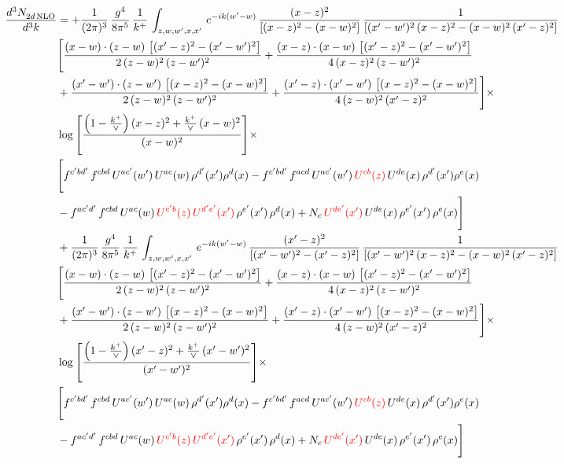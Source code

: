 \documentclass[9pt]{article}
\numberwithin{equation}{section}
\begin{document}
\begin{align}
 \frac{d^{3}N_{2d\,\rm NLO}^{\rm}}{d^{3}k}  & =   +\frac{1}{(2\pi)^{3}}\, \frac{g^{4}}{8\pi^{5}}\,\frac{1}{k^{+}}\,\int_{z,w,w^{\prime},x,x'}\, e^{-ik(w^{\prime}-w)}\,\frac{(x-z)^{2}}{\left[(x-z)^{2}-(x-w)^{2}\right]}\,\frac{1}{\left[(x'-w')^{2}\,(x-z)^{2} - (x-w)^{2}\,(x'-z)^{2}\right]}\notag \\ & \Bigg[\frac{(x-w)\cdot (z-w)\, \left[(x'-z)^{2}-(x'-w')^{2}\right]}{2\, (z-w)^{2}\, (z-w')^{2}}  + \frac{(x-z)\cdot (x-w)\,\left[(x'-z)^{2}-(x'-w')^{2}\right] }{4\,(x-z)^{2}\,(z-w')^{2}}\notag \\ & +\frac{(x'-w')\cdot (z-w')\, \left[(x-z)^{2}-(x-w)^{2}\right]}{2\, (z-w)^{2}\, (z-w')^{2}}+ \frac{(x'-z)\cdot (x'-w')\, \left[(x-z)^{2}-(x-w)^{2}\right]}{4\, (z-w)^{2}\,(x'-z)^{2}}\Bigg]\times\,\notag \\ & \log{\left[\frac{\left(1-\frac{k^{+}}{\vee}\right)(x-z)^{2}+\frac{k^{+}}{\vee}\,(x-w)^{2}}{(x-w)^{2}}\right]} \times\notag \\ & \Bigg[f^{c'bd'}\,f^{cbd}\, U^{ac'}(w')\,U^{ac}(w)\,\rho^{d'}(x')\rho^{d}(x)- f^{c'bd'}\,f^{acd}\,U^{ac'}(w')\,{\color{red}U^{cb}(z)}\,U^{de}(x)\,\rho^{d'}(x')\rho^{e}(x) \notag \\ & -f^{ac'd'}\,f^{cbd}\,U^{ac}(w)\,{\color{red}U^{c'b}(z)\,U^{d'e'}(x')}\,\rho^{e'}(x')\,\rho^{d}(x) +N_{c}\,{\color{red}U^{de'}(x')}\,U^{de}(x)\,\rho^{e'}(x')\,\rho^{e}(x)\Bigg] \notag \\
& +\frac{1}{(2\pi)^{3}}\, \frac{g^{4}}{8\pi^{5}}\,\frac{1}{k^{+}}\,\int_{z,w,w^{\prime},x,x'}\, e^{-ik(w^{\prime}-w)}\,\frac{(x'-z)^{2}}{\left[(x'-w')^{2}-(x'-z)^{2}\right]}\,\frac{1}{\left[(x'-w')^{2}\,(x-z)^{2} - (x-w)^{2}\,(x'-z)^{2}\right]}\notag \\ & \Bigg[\frac{(x-w)\cdot (z-w)\, \left[(x'-z)^{2}-(x'-w')^{2}\right]}{2\, (z-w)^{2}\, (z-w')^{2}}  + \frac{(x-z)\cdot (x-w)\,\left[(x'-z)^{2}-(x'-w')^{2}\right] }{4\,(x-z)^{2}\,(z-w')^{2}}\notag \\ & +\frac{(x'-w')\cdot (z-w')\, \left[(x-z)^{2}-(x-w)^{2}\right]}{2\, (z-w)^{2}\, (z-w')^{2}}+ \frac{(x'-z)\cdot (x'-w')\, \left[(x-z)^{2}-(x-w)^{2}\right]}{4\, (z-w)^{2}\,(x'-z)^{2}}\Bigg]\times\,\notag \\ & \log{\left[\frac{\left(1-\frac{k^{+}}{\vee}\right)(x'-z)^{2}+\frac{k^{+}}{\vee}\,(x'-w')^{2}}{(x'-w')^{2}}\right]} \times\notag \\ & \Bigg[f^{c'bd'}\,f^{cbd}\, U^{ac'}(w')\,U^{ac}(w)\,\rho^{d'}(x')\rho^{d}(x)- f^{c'bd'}\,f^{acd}\,U^{ac'}(w')\,{\color{red}U^{cb}(z)}\,U^{de}(x)\,\rho^{d'}(x')\rho^{e}(x) \notag \\ & -f^{ac'd'}\,f^{cbd}\,U^{ac}(w)\,{\color{red}U^{c'b}(z)\,U^{d'e'}(x')}\,\rho^{e'}(x')\,\rho^{d}(x) +N_{c}\,{\color{red}U^{de'}(x')}\,U^{de}(x)\,\rho^{e'}(x')\,\rho^{e}(x)\Bigg]
\end{align}
\end{document}
